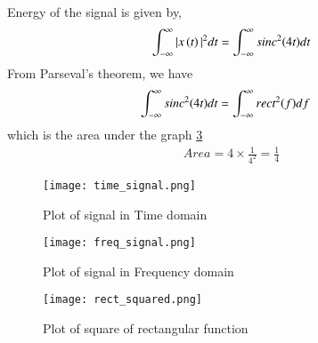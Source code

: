 \documentclass[journal,12pt,twocolumn]{IEEEtran}
\begin{document}
Energy of the signal is given by,
\begin{align}
    \int_{-\infty}^{\infty} |x\left(t\right)|^{2} dt = \int_{-\infty}^{\infty} sinc^2{\left(4t\right)}  dt
\end{align}
From Parseval's theorem, we have
\begin{align}
    \int_{-\infty}^{\infty} sinc^2{\left(4t\right)}  dt &= \int_{-\infty}^{\infty} rect^2{\left(f\right)}  df
\end{align}
which is the area under the graph \ref{fig:rect_squared}
\begin{align}
    Area = 4 \times \frac{1}{4^2} = \frac{1}{4}
\end{align}
\begin{figure}[h!]
\centering
\texttt{[image: time\_signal.png]}
\caption{Plot of signal in Time domain}
\label{fig:sig_time}
\end{figure}
\begin{figure}[h!]
\centering
\texttt{[image: freq\_signal.png]}
\caption{Plot of signal in Frequency domain}
\label{fig:sig_freq}
\end{figure}
\begin{figure}[h!]
\centering
\texttt{[image: rect\_squared.png]}
\caption{Plot of square of rectangular function}
\label{fig:rect_squared}
\end{figure}
\end{document}
